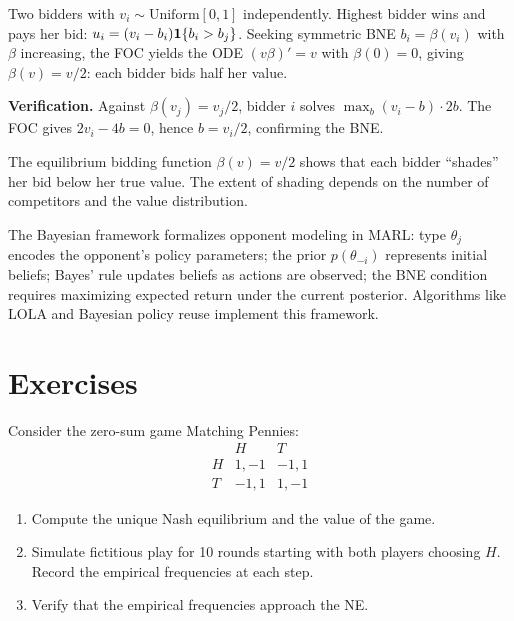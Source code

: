 \documentclass[11pt,a4paper]{article}
\begin{document}
\begin{example}
\label{ex:auction}
Two bidders with $v_i \sim \mathrm{Uniform}[0,1]$ independently.
Highest bidder wins and pays her bid:
$u_i = (v_i - b_i)\mathbf{1}\{b_i > b_j\}$. Seeking symmetric BNE
$b_i = \beta(v_i)$ with $\beta$ increasing, the FOC yields the ODE
$(v\beta)' = v$ with $\beta(0) = 0$, giving $\beta(v) = v/2$: each
bidder bids half her value.

\textbf{Verification.} Against $\beta(v_j) = v_j/2$, bidder $i$ solves
$\max_b(v_i - b)\cdot 2b$. The FOC gives $2v_i - 4b = 0$, hence
$b = v_i/2$, confirming the BNE.

The equilibrium bidding function $\beta(v) = v/2$ shows that each bidder
``shades'' her bid below her true value. The extent of shading depends
on the number of competitors and the value distribution.
\end{example}

\begin{rlconnection}[title={Opponent Modeling as Bayesian Inference}]
The Bayesian framework formalizes opponent modeling in MARL: type
$\theta_j$ encodes the opponent's policy parameters; the prior
$p(\theta_{-i})$ represents initial beliefs; Bayes' rule updates beliefs
as actions are observed; the BNE condition requires maximizing expected
return under the current posterior. Algorithms like LOLA and Bayesian
policy reuse implement this framework.
\end{rlconnection}


\section{Exercises}
\label{sec:exercises}

\begin{exercise}
\label{ex:fp-matching-pennies}
Consider the zero-sum game Matching Pennies:
\[
\begin{array}{c|cc}
  & H & T \\ \hline
H & 1,-1 & -1,1 \\
T & -1,1 & 1,-1
\end{array}
\]
\begin{enumerate}[label=(\alph*)]
    \item Compute the unique Nash equilibrium and the value of the game.
    \item Simulate fictitious play for 10 rounds starting with both
    players choosing $H$. Record the empirical frequencies at each step.
    \item Verify that the empirical frequencies approach the NE.
\end{enumerate}
\end{exercise}
\end{document}
